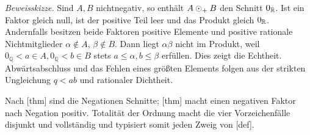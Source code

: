 \documentclass[main.tex]{subfiles}
\begin{document}


\emph{Beweisskizze.}
Sind \(A,B\) nichtnegativ, so enthält \(A\mathbin{\odot_{+}} B\) den Schnitt
\(0_{\mathbb R}\). Ist ein Faktor gleich null, ist der positive Teil leer und das
Produkt gleich \(0_{\mathbb R}\). Andernfalls besitzen beide Faktoren positive
Elemente und positive rationale Nichtmitglieder \(\alpha\notin A\),
\(\beta\notin B\). Dann liegt \(\alpha\beta\) nicht im Produkt, weil
\(0_{\mathbb Q}<a\in A,0_{\mathbb Q}<b\in B\) stets
\(a\leq\alpha,b\leq\beta\) erfüllen. Dies zeigt
die Echtheit. Abwärtsabschluss und das Fehlen eines größten Elements folgen
aus der strikten Ungleichung \(q<ab\) und rationaler Dichtheit.

Nach [thm] sind die Negationen
Schnitte; [thm] macht einen negativen
Faktor nach Negation positiv. Totalität der Ordnung macht die vier
Vorzeichenfälle disjunkt und vollständig und typisiert somit jeden Zweig von
[def].
\end{document}
